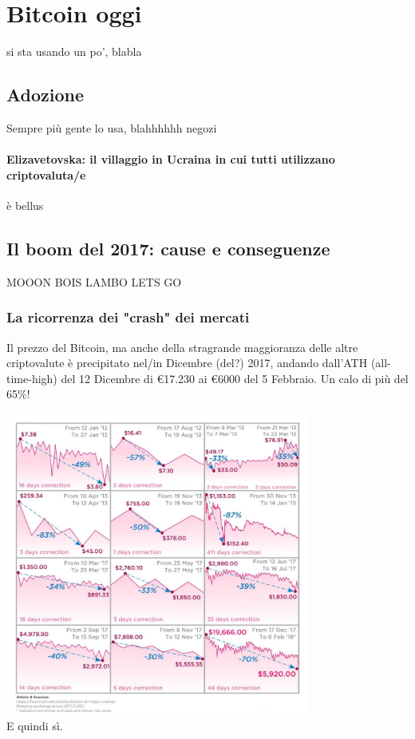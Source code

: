 \documentclass {article}
\begin{document}
\section {Bitcoin oggi}


si sta usando un po', blabla


\subsection {Adozione}


Sempre più gente lo usa, blahhhhhh negozi


\paragraph {Elizavetovska: il villaggio in Ucraina in cui tutti utilizzano criptovaluta/e}


è bellus


\subsection {Il boom del 2017: cause e conseguenze}


MOOON BOIS LAMBO LETS GO


\subsubsection {La ricorrenza dei "crash" dei mercati}


Il prezzo del Bitcoin, ma anche della stragrande maggioranza delle altre criptovalute è precipitato nel/in Dicembre (del?) 2017, andando dall'ATH (all-time-high) del 12 Dicembre di \euro{}17.230 ai \euro{}6000 del 5 Febbraio. Un calo di più del 65\%!

\vspace {0.5cm}
\includegraphics [width = 10cm] {media/crash.jpg}
\vspace {0.5cm}
\\
E quindi sì.
\end{document}
